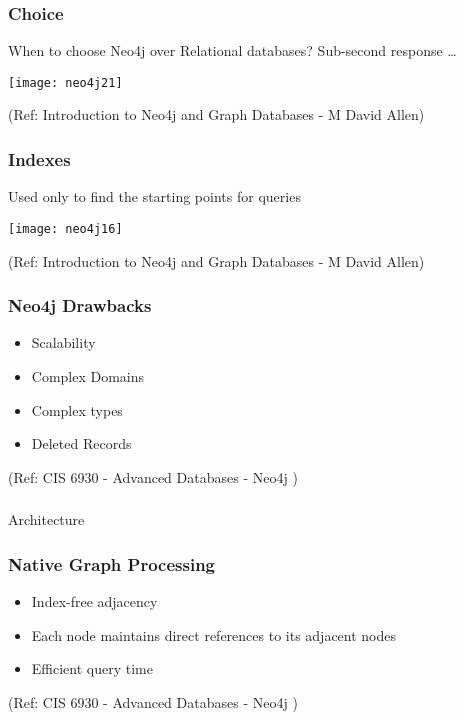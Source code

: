 \begin{frame}[fragile]\frametitle{Choice}
When to choose Neo4j over Relational databases? Sub-second response \ldots


\begin{center}
\texttt{[image: neo4j21]}
\end{center}	    

{\tiny (Ref: Introduction to Neo4j and Graph Databases
 - M David Allen)}

\end{frame}


\begin{frame}[fragile]\frametitle{Indexes}
Used only to find the starting points for queries

\begin{center}
\texttt{[image: neo4j16]}
\end{center}	  


{\tiny (Ref: Introduction to Neo4j and Graph Databases
 - M David Allen)}

\end{frame}

\begin{frame}\frametitle{Neo4j Drawbacks}


\begin{itemize}
\item  Scalability
\item   Complex Domains
\item   Complex types
\item   Deleted Records
\end{itemize}

 

{\tiny (Ref: CIS 6930 - Advanced Databases - Neo4j )}
\end{frame}

\begin{frame}[fragile]\frametitle{}
\begin{center}
{\Large Architecture}
\end{center}
\end{frame}

\begin{frame}\frametitle{Native Graph Processing}



\begin{itemize}
\item Index-free adjacency
\item Each node maintains direct references to its adjacent nodes
\item Efficient query time
\end{itemize}

{\tiny (Ref: CIS 6930 - Advanced Databases - Neo4j )}
\end{frame}

